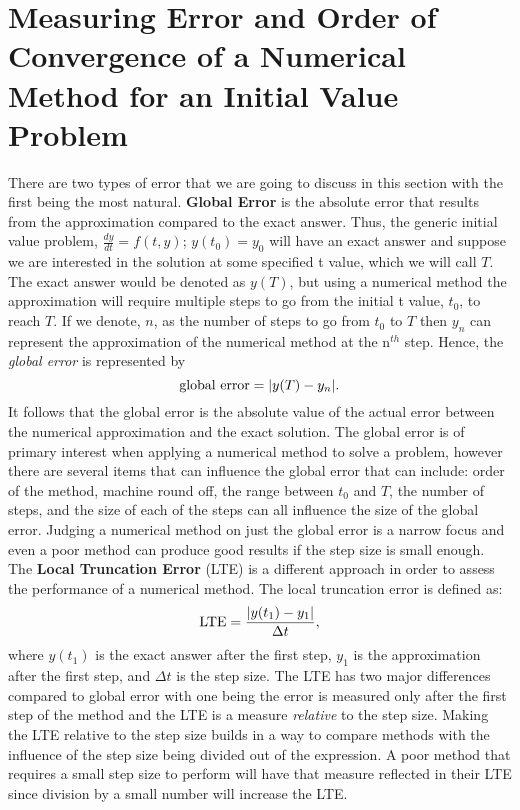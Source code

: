 \documentclass[twoside]{article}
\def\ds{\displaystyle}
\begin{document}
\section{Measuring Error and Order of Convergence of a Numerical Method for an Initial Value Problem}
There are two types of error that we are going to discuss in this section with the first being the most natural. {\bf Global Error} is the absolute error that results from the approximation compared to the exact answer. Thus, the generic initial value problem, $\ds \frac {dy}{dt} = f(t,y)$; $\ds y(t_0) = y_0$ will have an exact answer and suppose we are interested in the solution at some specified t value, which we will call $T$. The exact answer would be denoted as $\ds y(T)$, but using a numerical method the approximation will require multiple steps to go from the initial t value, $\ds t_0$, to reach $T$. If we denote, $n$, as the number of steps to go from $\ds t_0$ to $T$ then $\ds y_n$ can represent the approximation of the numerical method at the n$^{th}$ step. Hence, the {\it global error} is represented by
$${\rm global \ error} = \vert y(T)-y_n\vert .$$
It follows that the global error is the absolute value of the actual error between the numerical approximation and the exact solution. The global error is of primary interest when applying a numerical method to solve a problem, however there are several items that can influence the global error that can include: order of the method, machine round off, the range between $\ds t_0$ and $T$, the number of steps, and the size of each of the steps can all influence the size of the global error. Judging a numerical method on just the global error is a narrow focus and even a poor method can produce good results if the step size is small enough. The {\bf Local Truncation Error} (LTE) is a different approach in order to assess the performance of a numerical method. The local truncation error is defined as:
$${\rm LTE} = \frac {\vert y(t_1) - y_1\vert}{\Delta t},$$
where $\ds y(t_1)$ is the exact answer after the first step, $\ds y_1$ is the approximation after the first step, and $\ds \Delta t$ is the step size. The LTE has two major differences compared to global error with one being the error is measured only after the first step of the method and the LTE is a measure {\it relative} to the step size. Making the LTE relative to the step size builds in a way to compare methods with the influence of the step size being divided out of the expression. A poor method that requires a small step size to perform will have that measure reflected in their LTE since division by a small number will increase the LTE.  
\end{document}
